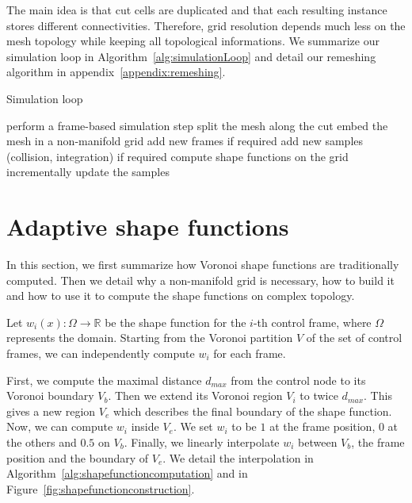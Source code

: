 The main idea is that cut cells are duplicated and that each resulting instance stores different connectivities. 
Therefore, grid resolution depends much less on the mesh topology while keeping all topological informations.
We summarize our simulation loop in Algorithm~\ref{alg:simulationLoop} and detail our remeshing algorithm in appendix~\ref{appendix:remeshing}.

\begin{algorithm}[!h]
\caption[Frame-based cutting: Simulation loop]{\label{alg:simulationLoop}Simulation loop}
\begin{algorithmic}[0]
	\State perform a frame-based simulation step
	\State split the mesh along the cut
	\State embed the mesh in a non-manifold grid
	\State add new frames if required
	\State add new samples (collision, integration) if required
	\State compute shape functions on the grid
	\State incrementally update the samples
\EndFor
\end{algorithmic}
\end{algorithm}

\newpage

\section{Adaptive shape functions} \label{sec:adaptivesf}

In this section, we first summarize how Voronoi shape functions are traditionally computed. 
Then we detail why a non-manifold grid is necessary, how to build it and how to use it to compute the shape functions on complex topology.

Let $w_{i}(x) : \Omega \rightarrow \mathbb{R}$ be the shape function for the $i$-th control frame, where $\Omega$ represents the domain. Starting from the Voronoi partition $V$ of the set of control frames, we can independently compute $w_{i}$ for each frame.

First, we compute the maximal distance $d_{max}$ from the control node to its Voronoi boundary $V_{b}$. Then we extend its Voronoi region $V_{i}$ to twice $d_{max}$. This gives a new region $V_{e}$ which describes the final boundary of the shape function. Now, we can compute $w_{i}$ inside $V_{e}$. We set $w_{i}$ to be $1$ at the frame position, $0$ at the others and $0.5$ on $V_{b}$. Finally, we linearly interpolate $w_{i}$ between $V_{b}$, the frame position and the boundary of $V_{e}$. We detail the interpolation in Algorithm~\ref{alg:shapefunctioncomputation} and in Figure~\ref{fig:shapefunctionconstruction}.

